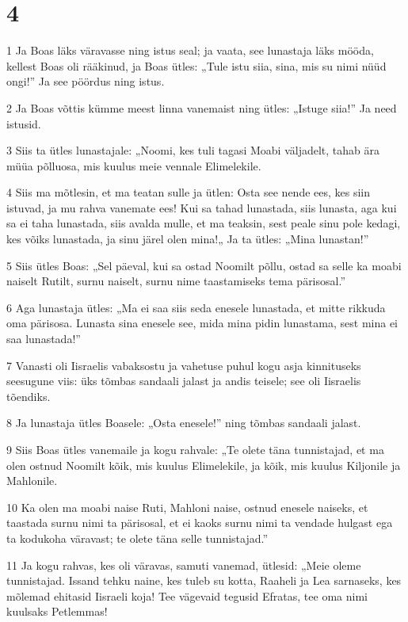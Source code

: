 \chapter{4}

\par 1 Ja Boas läks väravasse ning istus seal; ja vaata, see lunastaja läks mööda, kellest Boas oli rääkinud, ja Boas ütles: „Tule istu siia, sina, mis su nimi nüüd ongi!” Ja see pöördus ning istus.
\par 2 Ja Boas võttis kümme meest linna vanemaist ning ütles: „Istuge siia!” Ja need istusid.
\par 3 Siis ta ütles lunastajale: „Noomi, kes tuli tagasi Moabi väljadelt, tahab ära müüa põlluosa, mis kuulus meie vennale Elimelekile.
\par 4 Siis ma mõtlesin, et ma teatan sulle ja ütlen: Osta see nende ees, kes siin istuvad, ja mu rahva vanemate ees! Kui sa tahad lunastada, siis lunasta, aga kui sa ei taha lunastada, siis avalda mulle, et ma teaksin, sest peale sinu pole kedagi, kes võiks lunastada, ja sinu järel olen mina!„ Ja ta ütles: „Mina lunastan!”
\par 5 Siis ütles Boas: „Sel päeval, kui sa ostad Noomilt põllu, ostad sa selle ka moabi naiselt Rutilt, surnu naiselt, surnu nime taastamiseks tema pärisosal.”
\par 6 Aga lunastaja ütles: „Ma ei saa siis seda enesele lunastada, et mitte rikkuda oma pärisosa. Lunasta sina enesele see, mida mina pidin lunastama, sest mina ei saa lunastada!”
\par 7 Vanasti oli Iisraelis vabaksostu ja vahetuse puhul kogu asja kinnituseks seesugune viis: üks tõmbas sandaali jalast ja andis teisele; see oli Iisraelis tõendiks.
\par 8 Ja lunastaja ütles Boasele: „Osta enesele!” ning tõmbas sandaali jalast.
\par 9 Siis Boas ütles vanemaile ja kogu rahvale: „Te olete täna tunnistajad, et ma olen ostnud Noomilt kõik, mis kuulus Elimelekile, ja kõik, mis kuulus Kiljonile ja Mahlonile.
\par 10 Ka olen ma moabi naise Ruti, Mahloni naise, ostnud enesele naiseks, et taastada surnu nimi ta pärisosal, et ei kaoks surnu nimi ta vendade hulgast ega ta kodukoha väravast; te olete täna selle tunnistajad.”
\par 11 Ja kogu rahvas, kes oli väravas, samuti vanemad, ütlesid: „Meie oleme tunnistajad. Issand tehku naine, kes tuleb su kotta, Raaheli ja Lea sarnaseks, kes mõlemad ehitasid Iisraeli koja! Tee vägevaid tegusid Efratas, tee oma nimi kuulsaks Petlemmas!
